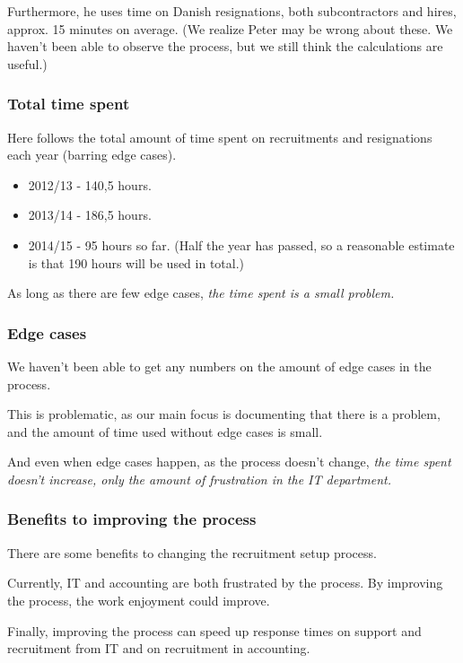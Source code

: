 Furthermore, he uses time on Danish resignations, both subcontractors and hires, approx. 15 minutes on average.
(We realize Peter may be wrong about these. We haven't been able to observe the process, but we still think the calculations are useful.)


\subsubsection{Total time spent}
Here follows the total amount of time spent on recruitments and resignations each year (barring edge cases).
\begin{itemize}
\item 2012/13 - 140,5 hours.
\item 2013/14 - 186,5 hours.
\item 2014/15 - 95 hours so far. (Half the year has passed, so a reasonable estimate is that 190 hours will be used in total.)
\end{itemize}

As long as there are few edge cases, \emph{the time spent is a small problem.}

\subsubsection{Edge cases}
We haven't been able to get any numbers on the amount of edge cases in the process.

This is problematic, as our main focus is documenting that there is a problem, and the amount of time used without edge cases is small.

And even when edge cases happen, as the process doesn't change, \emph{the time spent doesn't increase, only the amount of frustration in the IT department.}

\subsubsection{Benefits to improving the process}
There are some benefits to changing the recruitment setup process.

Currently, IT and accounting are both frustrated by the process.
By improving the process, the work enjoyment could improve.

Finally, improving the process can speed up response times on support and recruitment from IT and on recruitment in accounting.

